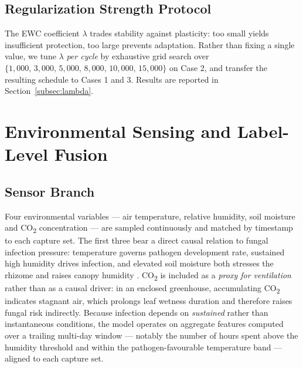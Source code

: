 \documentclass[journal]{IEEEtran}
\begin{document}
\subsection{Regularization Strength Protocol}

The EWC coefficient $\lambda$ trades stability against plasticity: too small yields
insufficient protection, too large prevents adaptation. Rather than fixing a single
value, we tune $\lambda$ \emph{per cycle} by exhaustive grid search over
$\{1{,}000,\,3{,}000,\,5{,}000,\,8{,}000,\,10{,}000,\,15{,}000\}$ on Case 2, and
transfer the resulting schedule to Cases 1 and 3. Results are reported in
Section~\ref{subsec:lambda}.

\section{Environmental Sensing and Label-Level Fusion}
\label{sec:fusion}

\subsection{Sensor Branch}

Four environmental variables --- air temperature, relative humidity, soil moisture
and CO\textsubscript{2} concentration --- are sampled continuously and matched by
timestamp to each capture set. The first three bear a direct causal relation to
fungal infection pressure: temperature governs pathogen development rate, sustained
high humidity drives infection, and elevated soil moisture both stresses the rhizome
and raises canopy humidity \cite{ref25}. CO\textsubscript{2} is included as a
\emph{proxy for ventilation} rather than as a causal driver: in an enclosed
greenhouse, accumulating CO\textsubscript{2} indicates stagnant air, which prolongs
leaf wetness duration and therefore raises fungal risk indirectly. Because infection
depends on \emph{sustained} rather than instantaneous conditions, the model operates
on aggregate features computed over a trailing multi-day window --- notably the
number of hours spent above the humidity threshold and within the
pathogen-favourable temperature band --- aligned to each capture set.
\end{document}
